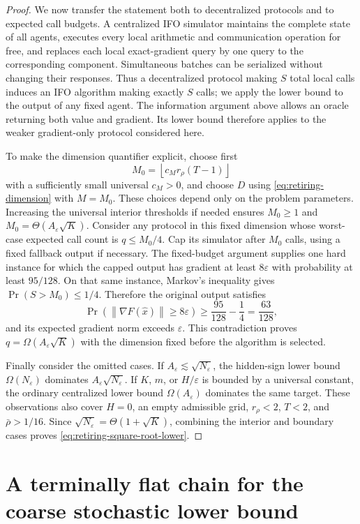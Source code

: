 \documentclass[11pt,a4paper]{article}
\newcommand{\eps}{\varepsilon}
\newcommand{\norm}[1]{\left\lVert #1\right\rVert}
\theoremstyle{remark}
\begin{document}
\begin{proof}
We now transfer the statement both to decentralized protocols and to expected
call budgets.  A centralized IFO simulator maintains the complete state of all
agents, executes every local arithmetic and communication operation for free,
and replaces each local exact-gradient query by one query to the corresponding
component.  Simultaneous batches can be serialized without changing their
responses.  Thus a decentralized protocol making $S$ total local calls induces
an IFO algorithm making exactly $S$ calls; we apply the lower bound to the
output of any fixed agent.  The information argument above allows an oracle returning both
value and gradient. Its lower bound therefore applies to the weaker
gradient-only protocol considered here.

To make the dimension quantifier explicit, choose first
\[
 M_0=\left\lfloor c_Mr_\rho(T-1)\right\rfloor
\]
with a sufficiently small universal $c_M>0$, and choose $D$ using
\eqref{eq:retiring-dimension} with $M=M_0$. These choices depend only on the
problem parameters. Increasing the universal interior thresholds if needed
ensures $M_0\ge1$ and $M_0=\Theta(A_\eps\sqrt K)$.
Consider any protocol in this fixed dimension whose worst-case expected
call count is $q\le M_0/4$. Cap its simulator after $M_0$ calls, using a
fixed fallback output if necessary. The fixed-budget argument supplies one
hard instance for which the capped output has gradient at least $8\eps$
with probability at least $95/128$. On that same instance, Markov's
inequality gives $\Pr(S>M_0)\le1/4$. Therefore the original output satisfies
\[
 \Pr\!\left(\norm{\nabla F(\widehat x)}\ge8\eps\right)
 \ge\frac{95}{128}-\frac14=\frac{63}{128},
\]
and its expected gradient norm exceeds $\eps$. This contradiction proves
$q=\Omega(A_\eps\sqrt K)$ with the dimension fixed before the algorithm
is selected.

Finally consider the omitted cases.  If $A_\eps\lesssim\sqrt{N_\eps}$, the
hidden-sign lower bound $\Omega(N_\eps)$ dominates
$A_\eps\sqrt{N_\eps}$.  If $K$, $m$, or $H/\eps$ is bounded by a universal
constant, the ordinary centralized lower bound $\Omega(A_\eps)$ dominates the
same target.  These observations also cover $H=0$, an empty admissible grid,
$r_\rho<2$, $T<2$, and $\bar\rho>1/16$.  Since
$\sqrt{N_\eps}=\Theta(1+\sqrt K)$, combining the interior and boundary cases
proves \eqref{eq:retiring-square-root-lower}.
\end{proof}

\section{A terminally flat chain for the coarse stochastic lower bound}
\label{sec:stochastic-coarse-closure}
\end{document}
